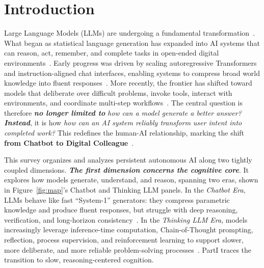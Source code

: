 \section{Introduction}
\label{sec:introduction}

Large Language Models (LLMs) are undergoing a fundamental transformation~\citep{bommasani2021opportunities,min2023recent,naveed2025comprehensive,wang2024survey,xi2023rise,qin2025largelanguagemodelsmeet}. What began as statistical language generation has expanded into AI systems that can reason, act, remember, and complete tasks in open-ended digital environments~\citep{yao2022react,park2023generative,zhang2025survey}. Early progress was driven by scaling autoregressive Transformers and instruction-aligned chat interfaces, enabling systems to compress broad world knowledge into fluent responses~\citep{vaswani2017attention,brown2020language,kaplan2020scaling,hoffmann2022chinchilla,achiam2023gpt}. More recently, the frontier has shifted toward models that deliberate over difficult problems, invoke tools, interact with environments, and coordinate multi-step workflows~\citep{wei2022chain,deepseek2025r1,schick2023toolformer,qin2023toolllm,wu2023autogen,hong2023metagpt}. The central question is therefore \textit{\textbf{no longer limited to}} \textit{how can a model generate a better answer?} \textit{\textbf{Instead}}, it is how \textit{how can an AI system reliably transform user intent into completed work?} This redefines the human-AI relationship, marking the shift \textbf{from Chatbot to Digital Colleague}~\citep{openai2022chatgpt,bigscience2022bloom,google2024gemma2,jiang2023mistral7b,chen2023palix}.

This survey organizes and analyzes persistent autonomous AI along two tightly coupled dimensions. 
 \textit{\textbf{The first dimension concerns the cognitive core}}. It explores how models generate, understand, and reason, spanning two eras, shown in Figure~\ref{fig:map}'s Chatbot and Thinking LLM panels. In the \textit{Chatbot Era}, LLMs behave like fast ``System-1'' generators: they compress parametric knowledge and produce fluent responses, but struggle with deep reasoning, verification, and long-horizon consistency~\citep{petroni2019language,huang2023towards,dziri2023faith,valmeekam2022large}. In the \textit{Thinking LLM Era}, models increasingly leverage inference-time computation, Chain-of-Thought prompting, reflection, process supervision, and reinforcement learning to support slower, more deliberate, and more reliable problem-solving processes~\citep{snell2024scaling,kojima2022large,madaan2023selfrefine,shinn2023reflexion,lightman2024lets,shao2024deepseekmath,deepseek2025r1}. PartI traces the transition to slow, reasoning-centered cognition\citep{schneider2025generative,wei2026agentic,patil2025advancing,zhao2026edge,hu2024survey}.


